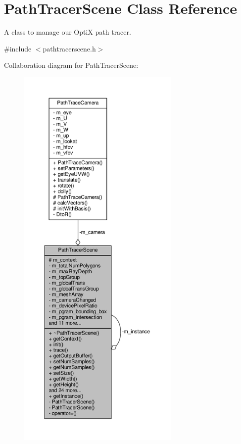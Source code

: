 \hypertarget{class_path_tracer_scene}{\section{Path\-Tracer\-Scene Class Reference}
\label{class_path_tracer_scene}
}


A class to manage our Opti\-X path tracer.  




{\ttfamily \#include $<$pathtracerscene.\-h$>$}



Collaboration diagram for Path\-Tracer\-Scene\-:
\nopagebreak
\begin{figure}[H]
\begin{center}
\leavevmode
\includegraphics[height=550pt]{class_path_tracer_scene__coll__graph}
\end{center}
\end{figure}
